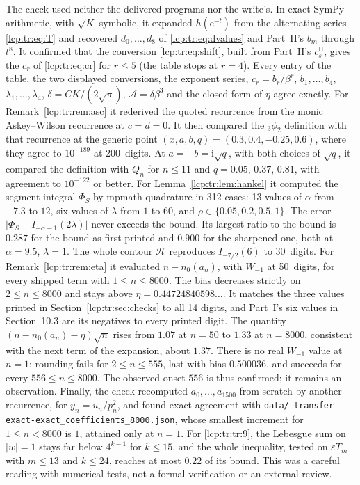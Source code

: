 \documentclass[11pt]{article}
\numberwithin{equation}{section}
\theoremstyle{definition}\newtheorem{definition}[theorem]{Definition}
\theoremstyle{remark}\newtheorem{remark}[theorem]{Remark}
\newcommand{\ee}{\mathrm e}
\newcommand{\ii}{\mathrm i}%
\begin{document}
The check used neither the delivered programs nor the write's. In exact
SymPy arithmetic, with $\sqrt K$ symbolic, it expanded $h(\ee^{-t})$ from
the alternating series \eqref{lcp:tr:eq:T} and recovered $d_0,\ldots,d_8$
of \eqref{lcp:tr:eq:dvalues} and Part~II's $b_m$ through $t^8$. It
confirmed that the conversion \eqref{lcp:tr:eq:shift}, built from Part~II's
$c^{\mathrm{II}}_s$, gives the $c_r$ of \eqref{lcp:tr:eq:cr} for $r\le5$
(the table stops at $r=4$). Every entry of the table, the two displayed
conversions, the exponent series, $c_r=b_r/\beta^r$, $b_1,\ldots,b_4$,
$\lambda_1,\ldots,\lambda_4$, $\delta=CK/(2\sqrt\pi)$,
$\mathcal A=\delta\beta^3$ and the closed form of $\eta$ agree exactly.
For Remark~\ref{lcp:tr:rem:asc} it rederived the quoted recurrence from
the monic Askey--Wilson recurrence at $c=d=0$. It then compared the
${}_3\phi_2$ definition with that recurrence at the generic point
$(x,a,b,q)=(0.3,0.4,-0.25,0.6)$, where they agree to $10^{-189}$ at
200~digits. At $a=-b=\ii\sqrt q$, with both choices of $\sqrt q$, it compared
the definition with $Q_n$ for $n\le11$ and $q=0.05$, $0.37$, $0.81$, with
agreement to $10^{-122}$ or better. For Lemma~\ref{lcp:tr:lem:hankel} it
computed the segment integral $\Phi_S$ by mpmath quadrature in 312 cases:
13 values of $\alpha$ from $-7.3$ to $12$, six values of $\lambda$ from $1$
to $60$, and $\rho\in\{0.05,0.2,0.5,1\}$. The error
$|\Phi_S-I_{-\alpha-1}(2\lambda)|$ never exceeds the bound. Its largest
ratio to the bound is $0.287$ for the bound as first printed and $0.900$
for the sharpened one, both at $\alpha=9.5$, $\lambda=1$. The whole contour
$\mathcal H$ reproduces $I_{-7/2}(6)$ to 30~digits. For
Remark~\ref{lcp:tr:rem:eta} it evaluated $n-n_0(a_n)$, with $W_{-1}$ at
50~digits, for every shipped term with $1\le n\le8000$. The bias decreases
strictly on $2\le n\le8000$ and stays above $\eta=0.44724840598\ldots$. It
matches the three values printed in Section~\ref{lcp:tr:sec:checks} to all
14 digits, and Part~I's six values in Section~10.3 are its negatives to
every printed digit. The quantity
$(n-n_0(a_n)-\eta)\sqrt n$ rises from $1.07$ at $n=50$ to $1.33$ at
$n=8000$, consistent with the next term of the expansion, about $1.37$.
There is no real $W_{-1}$ value at $n=1$; rounding fails for
$2\le n\le555$, last with bias $0.500036$, and succeeds for every
$556\le n\le8000$. The observed onset $556$ is thus confirmed; it remains
an observation. Finally, the check recomputed $a_0,\ldots,a_{1500}$ from
scratch by another recurrence, for $y_n=u_n/p_n^2$, and found exact
agreement with
\texttt{data/-transfer-exact-exact\_coefficients\_8000.json},
whose smallest increment for $1\le n<8000$ is $1$, attained only at $n=1$.
For \eqref{lcp:tr:tr:9}, the Lebesgue sum on $|w|=1$ stays far below
$4^{k-1}$ for $k\le15$, and the whole inequality, tested on
$\varepsilon T_m$ with $m\le13$ and $k\le24$, reaches at most $0.22$ of its
bound. This was a careful reading with numerical tests, not a formal
verification or an external review.
\end{document}

